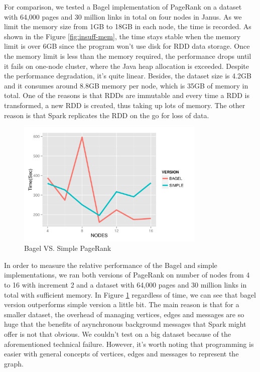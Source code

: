 \documentclass{article}
\begin{document}
For comparison, we tested a Bagel implementation of PageRank on a dataset with
64,000 pages and 30 million links in total on four nodes in Janus. As we limit
the memory size from 1GB to 18GB in each node, the time is recorded. As shown
in the Figure \ref{fig:insuff-mem}, the time stays stable when the memory limit
is over 6GB since the program won’t use disk for RDD data storage. Once the
memory limit is less than the memory required, the performance drops until it
fails on one-node cluster, where the Java heap allocation is exceeded. Despite
the performance degradation, it's quite linear. Besides, the dataset size is
4.2GB and it consumes around 8.8GB memory per node, which is 35GB of memory in
total. One of the reasons is that RDDs are immutable and every time a RDD is
transformed, a new RDD is created, thus taking up lots of memory. The other
reason is that Spark replicates the RDD on the go for loss of data.

\begin{figure}[H]
        \centering
        \includegraphics[width=90mm]{images/bagelsimple.png}
        \caption{Bagel VS. Simple PageRank}
        \label{fig:bagelsimple}
    \end{figure}

In order to measure the relative performance of the Bagel and simple
implementations, we ran both versions of PageRank on
number of nodes from 4 to 16 with increment 2 and a dataset with 64,000 pages and
30 million links in total with sufficient memory. In Figure
\ref{fig:bagelsimple} regardless of time, we can see that bagel version
outperforms simple version a little bit. The main reason is that for a smaller
dataset, the overhead of managing vertices, edges and messages are so huge that
the benefits of asynchronous background messages that Spark might offer is not
that obvious. We couldn't test on a big dataset because of the aforementioned
technical failure. However, it's worth noting that programming is easier with
general concepts of vertices, edges and messages to represent the graph.
\end{document}
